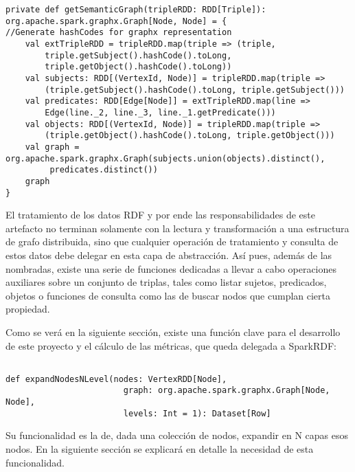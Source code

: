 \lstset{escapechar=@,language=scala}
\begin{lstlisting}[caption={Conversión de RDD de Triplas a Grafo de nodos},captionpos=b, label=graphcomposer]
private def getSemanticGraph(tripleRDD: RDD[Triple]): org.apache.spark.graphx.Graph[Node, Node] = {
//Generate hashCodes for graphx representation
    val extTripleRDD = tripleRDD.map(triple => (triple,
        triple.getSubject().hashCode().toLong,
        triple.getObject().hashCode().toLong))
    val subjects: RDD[(VertexId, Node)] = tripleRDD.map(triple =>
        (triple.getSubject().hashCode().toLong, triple.getSubject()))
    val predicates: RDD[Edge[Node]] = extTripleRDD.map(line =>
        Edge(line._2, line._3, line._1.getPredicate()))
    val objects: RDD[(VertexId, Node)] = tripleRDD.map(triple =>
        (triple.getObject().hashCode().toLong, triple.getObject()))
    val graph = org.apache.spark.graphx.Graph(subjects.union(objects).distinct(),
         predicates.distinct())
    graph
}
\end{lstlisting}

El tratamiento de los datos RDF y por ende las responsabilidades de este
artefacto no terminan solamente con la lectura y transformación a una estructura
de grafo distribuida, sino que cualquier operación de tratamiento y consulta de
estos datos debe delegar en esta capa de abstracción. Así pues, además de las
nombradas, existe una serie de funciones dedicadas a llevar a cabo operaciones
auxiliares sobre un conjunto de triplas, tales como listar sujetos, predicados,
objetos o funciones de consulta como las de buscar nodos que cumplan cierta
propiedad. 

Como se verá en la siguiente sección, existe una función clave para el
desarrollo de este proyecto y el cálculo de las métricas, que queda delegada a
SparkRDF:

\lstset{escapechar=@,language=scala}
\begin{lstlisting}[caption={Conversión de RDD de Triplas a Grafo de
      nodos},captionpos=b, label=headerexpand]

def expandNodesNLevel(nodes: VertexRDD[Node],
                        graph: org.apache.spark.graphx.Graph[Node, Node],
                        levels: Int = 1): Dataset[Row]   
\end{lstlisting}

Su funcionalidad es la de, dada una colección de nodos, expandir en N capas esos
nodos. En la siguiente sección se explicará en detalle la necesidad de esta
funcionalidad. 

